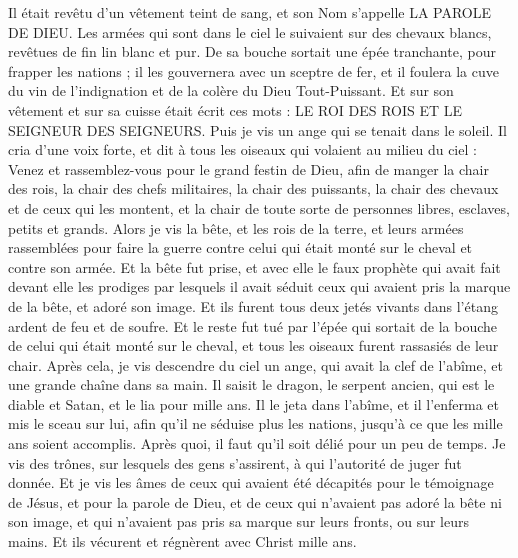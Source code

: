 \begin{multicols}{2}
Il était revêtu d'un vêtement teint de sang, et son Nom s'appelle LA PAROLE DE DIEU.
Les armées qui sont dans le ciel le suivaient sur des chevaux blancs, revêtues de fin lin blanc et pur.
De sa bouche sortait une épée tranchante, pour frapper les nations ; il les gouvernera avec un sceptre de fer, et il foulera la cuve du vin de l'indignation et de la colère du Dieu Tout-Puissant.
Et sur son vêtement et sur sa cuisse était écrit ces mots : LE ROI DES ROIS ET LE SEIGNEUR DES SEIGNEURS.
Puis je vis un ange qui se tenait dans le soleil. Il cria d'une voix forte, et dit à tous les oiseaux qui volaient au milieu du ciel : Venez et rassemblez-vous pour le grand festin de Dieu,
afin de manger la chair des rois, la chair des chefs militaires, la chair des puissants, la chair des chevaux et de ceux qui les montent, et la chair de toute sorte de personnes libres, esclaves, petits et grands.
Alors je vis la bête, et les rois de la terre, et leurs armées rassemblées pour faire la guerre contre celui qui était monté sur le cheval et contre son armée.
Et la bête fut prise, et avec elle le faux prophète qui avait fait devant elle les prodiges par lesquels il avait séduit ceux qui avaient pris la marque de la bête, et adoré son image. Et ils furent tous deux jetés vivants dans l'étang ardent de feu et de soufre.
Et le reste fut tué par l'épée qui sortait de la bouche de celui qui était monté sur le cheval, et tous les oiseaux furent rassasiés de leur chair.
\VerseOne{}Après cela, je vis descendre du ciel un ange, qui avait la clef de l'abîme, et une grande chaîne dans sa main.
Il saisit le dragon, le serpent ancien, qui est le diable et Satan, et le lia pour mille ans.
Il le jeta dans l'abîme, et il l'enferma et mis le sceau sur lui, afin qu'il ne séduise plus les nations, jusqu'à ce que les mille ans soient accomplis. Après quoi, il faut qu'il soit délié pour un peu de temps.
Je vis des trônes, sur lesquels des gens s'assirent, à qui l'autorité de juger fut donnée. Et je vis les âmes de ceux qui avaient été décapités pour le témoignage de Jésus, et pour la parole de Dieu, et de ceux qui n'avaient pas adoré la bête ni son image, et qui n'avaient pas pris sa marque sur leurs fronts, ou sur leurs mains. Et ils vécurent et régnèrent avec Christ mille ans.

\end{multicols}
